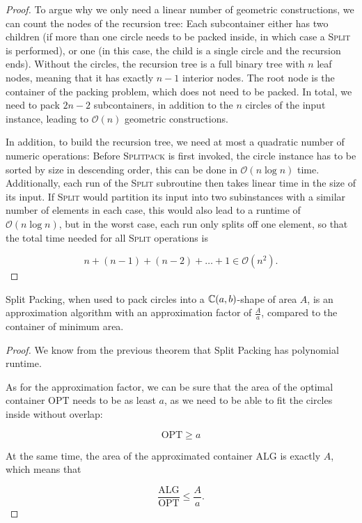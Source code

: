 \documentclass[a4paper,style=print,bibliography=totoc,nexus,lnum,extramargin]{tubsbook}
\begin{document}
\begin{proof}
    To argue why we only need a linear number of geometric constructions, we can count the nodes of the recursion tree: Each subcontainer either has two children (if more than one circle needs to be packed inside, in which case a \textsc{Split} is performed), or one (in this case, the child is a single circle and the recursion ends). Without the circles, the recursion tree is a full binary tree with $n$ leaf nodes, meaning that it has exactly $n-1$ interior nodes. The root node is the container of the packing problem, which does not need to be packed. In total, we need to pack $2n-2$ subcontainers, in addition to the $n$ circles of the input instance, leading to $\mathcal{O}(n)$ geometric constructions.

    In addition, to build the recursion tree, we need at most a quadratic number of numeric operations:
    Before \textsc{Splitpack} is first invoked, the circle instance has to be sorted by size in descending order, this can be done in $\mathcal{O}(n \log n)$ time. Additionally, each run of the \textsc{Split} subroutine then takes linear time in the size of its input. If \textsc{Split} would partition its input into two subinstances with a similar number of elements in each case, this would also lead to a runtime of $\mathcal{O}(n \log n)$, but in the worst case, each run only splits off one element, so that the total time needed for all \textsc{Split} operations is

    $$n + (n-1) + (n-2) + \dots + 1 \in \mathcal{O}(n^2).$$
\end{proof}

\begin{theorem}
    Split Packing, when used to pack circles into a $\mathbb{C}(a,b)$-shape of area $A$, is an approximation algorithm with an approximation factor of $\frac{A}{a}$, compared to the container of minimum area.
\end{theorem}

\begin{proof}
    We know from the previous theorem that Split Packing has polynomial runtime.

    As for the approximation factor, we can be sure that the area of the optimal container $\text{OPT}$ needs to be as least $a$, as we need to be able to fit the circles inside without overlap:

    $$\text{OPT} \ge a$$

    At the same time, the area of the approximated container $\text{ALG}$ is exactly $A$, which means that

    $$\frac{\text{ALG}}{\text{OPT}} \le \frac{A}{a}.$$
\end{proof}
\end{document}
